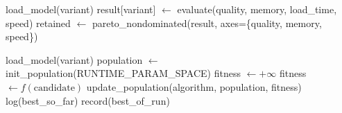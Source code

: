 \documentclass[conference, letterpaper]{IEEEtran}
\begin{document}
\appendix

\begin{algorithm}
\caption{Phase 1 --- Exhaustive quantization sweep}
\label{alg:phase1}
\begin{algorithmic}[1]
  \State load\_model(variant)
  \State result[variant] $\leftarrow$ evaluate(quality, memory, load\_time, speed)
\EndFor
\State retained $\leftarrow$ pareto\_nondominated(result, axes=\{quality, memory, speed\})
\end{algorithmic}
\end{algorithm}

\begin{algorithm}
\caption{Phase 2 --- Metaheuristic runtime search (per retained variant)}
\label{alg:phase2}
\begin{algorithmic}[1]
  \State load\_model(variant) 
      \State population $\leftarrow$ init\_population(RUNTIME\_PARAM\_SPACE)
           
            \State fitness $\leftarrow +\infty$ 
          \Else
            \State fitness $\leftarrow f(\text{candidate})$ 
          \EndIf
        \EndFor
        \State update\_population(algorithm, population, fitness)
        \State log(best\_so\_far)
      \EndFor
      \State record(best\_of\_run)
    \EndFor
  \EndFor
\EndFor
\end{algorithmic}
\end{algorithm}
\end{document}
